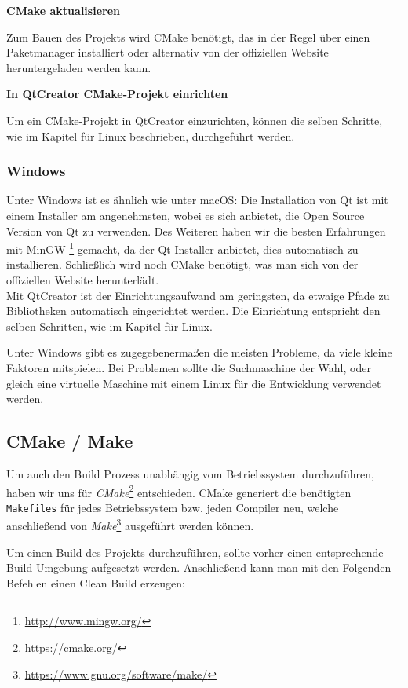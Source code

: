 \textbf{CMake aktualisieren}

Zum Bauen des Projekts wird CMake benötigt, das in der Regel über einen
Paketmanager installiert oder alternativ von der offiziellen Website
heruntergeladen werden kann.

\textbf{In QtCreator CMake-Projekt einrichten}

Um ein CMake-Projekt in QtCreator einzurichten, können die selben Schritte, wie
im Kapitel für Linux beschrieben, durchgeführt werden.

\subsubsection{Windows}

Unter Windows ist es ähnlich wie unter macOS: Die Installation von Qt ist mit
einem Installer am angenehmsten, wobei es sich anbietet, die Open Source Version
von Qt zu verwenden. Des Weiteren haben wir die besten Erfahrungen mit MinGW
\footnote{\url{http://www.mingw.org/}} gemacht, da der Qt Installer anbietet,
dies automatisch zu installieren. Schließlich wird noch CMake benötigt, was man
sich von der offiziellen Website herunterlädt. \\
Mit QtCreator ist der Einrichtungsaufwand am geringsten, da etwaige Pfade zu
Bibliotheken automatisch eingerichtet werden. Die Einrichtung entspricht den
selben Schritten, wie im Kapitel für Linux.

Unter Windows gibt es zugegebenermaßen die meisten Probleme, da viele kleine
Faktoren mitspielen. Bei Problemen sollte die Suchmaschine der Wahl, oder gleich
eine virtuelle Maschine mit einem Linux für die Entwicklung verwendet werden.

\subsection{CMake / Make}
\label{dev-report-cmake-build}
Um auch den Build Prozess unabhängig vom Betriebssystem durchzuführen, haben wir uns für
\textit{CMake}\footnote{\url{https://cmake.org/}} entschieden. CMake generiert die benötigten
\texttt{Makefiles} für jedes Betriebssystem bzw. jeden Compiler neu, welche anschließend
von \textit{Make}\footnote{\url{https://www.gnu.org/software/make/}} ausgeführt werden können.

Um einen Build des Projekts durchzuführen, sollte vorher einen entsprechende Build Umgebung
aufgesetzt werden. Anschließend kann man mit den Folgenden Befehlen einen Clean Build erzeugen:

